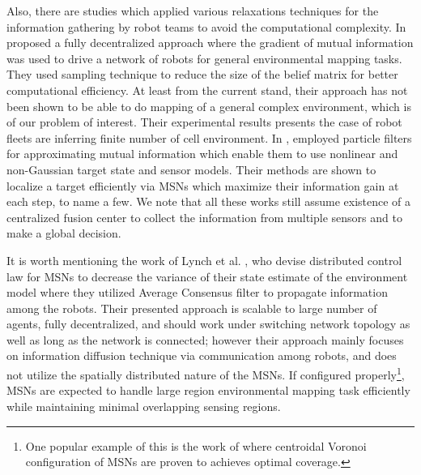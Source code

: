 \documentclass[letterpaper, 10 pt, conference]{ieeeconf}
\begin{document}
Also, there are studies which applied various relaxations techniques for the information gathering by robot teams to avoid the computational complexity. In \cite{julian2012distributed} proposed a fully decentralized approach where the gradient of mutual information was used to drive a network of robots for general environmental mapping tasks. They used sampling technique to reduce the size of the belief matrix for better computational efficiency. At least from the current stand, their approach has not been shown to be able to do mapping of a general complex environment, which is of our problem of interest. Their experimental results presents the case of robot fleets are inferring finite number of cell environment. In \cite{hoffmann2010mobile}, employed particle filters for approximating mutual information which enable them to use nonlinear and non-Gaussian target state and sensor models. Their methods are shown to localize a target efficiently via MSNs which maximize their information gain at each step, to name a few.
We note that all these works still assume existence of a centralized fusion center to collect the information from multiple sensors and to make a global decision.

It is worth mentioning the work of Lynch et al. \cite{lynch2008decentralized}, who devise distributed control law for MSNs to decrease the variance of their state estimate of the environment model where they utilized Average Consensus filter to propagate information among the robots. 
Their presented approach is scalable to large number of agents, fully decentralized, and should work under switching network topology as well as long as the network is connected; however their approach mainly focuses on information diffusion technique via communication among robots, and does not utilize the spatially distributed nature of the MSNs. If configured properly\footnote{One popular example of this is the work of \cite{cortes_coverage_2004} where centroidal Voronoi configuration of MSNs are proven to  achieves optimal coverage.}, MSNs are expected to handle large region environmental mapping task efficiently while maintaining minimal overlapping sensing regions.


\end{document}
